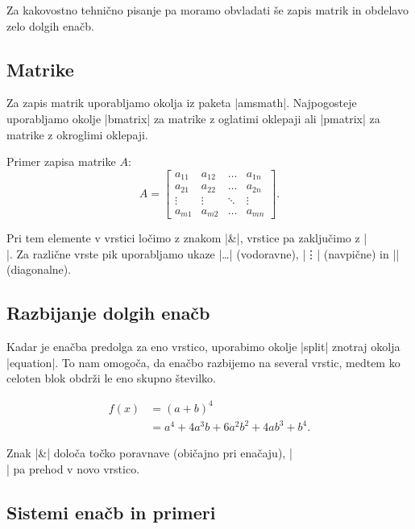 \documentclass[9pt]{style/friteza}
\begin{document}
Za kakovostno tehnično pisanje pa moramo obvladati še zapis matrik in obdelavo zelo dolgih enačb.

\subsection{Matrike}

Za zapis matrik uporabljamo okolja iz paketa \ltx|amsmath|. Najpogosteje uporabljamo okolje \ltx|bmatrix| za matrike z oglatimi oklepaji ali \ltx|pmatrix| za matrike z okroglimi oklepaji.

Primer zapisa matrike $A$:
\begin{equation}
    A = \begin{bmatrix}
        a_{11} & a_{12} & \dots  & a_{1n} \\
        a_{21} & a_{22} & \dots  & a_{2n} \\
        \vdots & \vdots & \ddots & \vdots \\
        a_{m1} & a_{m2} & \dots  & a_{mn}
    \end{bmatrix}.
\end{equation}

Pri tem elemente v vrstici ločimo z znakom \ltx|\&|, vrstice pa zaključimo z \ltx|\\|. Za različne vrste pik uporabljamo ukaze \ltx|\dots| (vodoravne), \ltx|\vdots| (navpične) in \ltx|\ddots| (diagonalne).

\subsection{Razbijanje dolgih enačb}

Kadar je enačba predolga za eno vrstico, uporabimo okolje \ltx|split| znotraj okolja \ltx|equation|. To nam omogoča, da enačbo razbijemo na several vrstic, medtem ko celoten blok obdrži le eno skupno številko.

\begin{equation}
    \begin{split}
        f(x) &= (a+b)^4 \\
             &= a^4 + 4a^3b + 6a^2b^2 + 4ab^3 + b^4.
    \end{split}
    \label{eq:razcep}
\end{equation}

Znak \ltx|\&| določa točko poravnave (običajno pri enačaju), \ltx|\\| pa prehod v novo vrstico.

\subsection{Sistemi enačb in primeri}
\end{document}
